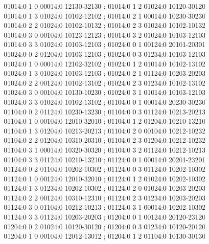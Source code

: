 \documentclass[11pt]{article}
\theoremstyle{remark}
\numberwithin{equation}{section}
\numberwithin{table}{section}
\begin{document}
\begin{flushleft}
01014:0 1 0 00014:0 12130-32130 ; 01014:0 1 2 01024:0 10120-30120\\
01014:0 1 3 01024:0 10102-12102 ; 01014:0 2 1 00014:0 10230-30230\\
01014:0 2 2 01024:0 10102-10132 ; 01014:0 2 3 01024:0 10102-10132\\
01014:0 3 0 00104:0 10123-12123 ; 01014:0 3 2 01024:0 10103-12103\\
01014:0 3 3 01024:0 10103-12103 ; 01024:0 0 1 00124:0 20101-20301\\
01024:0 0 2 01204:0 10103-12103 ; 01024:0 0 3 01234:0 10103-12103\\
01024:0 1 0 00014:0 12102-32102 ; 01024:0 1 2 01014:0 10102-13102\\
01024:0 1 3 01024:0 10103-12103 ; 01024:0 2 1 01124:0 10203-20203\\
01024:0 2 2 00124:0 10102-13102 ; 01024:0 2 3 01234:0 10102-13102\\
01024:0 3 0 00104:0 10130-10230 ; 01024:0 3 1 01014:0 10103-12103\\
01024:0 3 3 01024:0 10102-13102 ; 01104:0 0 1 00014:0 20230-30230\\
01104:0 0 2 01124:0 10230-13230 ; 01104:0 0 3 01124:0 10213-20213\\
01104:0 1 0 00104:0 12010-32010 ; 01104:0 1 2 01204:0 10210-13210\\
01104:0 1 3 01204:0 10213-20213 ; 01104:0 2 0 00104:0 10212-10232\\
01104:0 2 2 01204:0 10310-20310 ; 01104:0 2 3 01204:0 10212-10232\\
01104:0 3 1 00014:0 10320-30320 ; 01104:0 3 2 01124:0 10212-10213\\
01104:0 3 3 01124:0 10210-13210 ; 01124:0 0 1 00014:0 20201-23201\\
01124:0 0 2 01104:0 10202-10302 ; 01124:0 0 3 01124:0 10202-10302\\
01124:0 1 0 00124:0 12010-32010 ; 01124:0 1 2 01024:0 10202-10302\\
01124:0 1 3 01234:0 10202-10302 ; 01124:0 2 0 01024:0 10203-20203\\
01124:0 2 2 00124:0 10310-12310 ; 01124:0 2 3 01234:0 10203-20203\\
01124:0 3 0 01104:0 10212-10213 ; 01124:0 3 1 00014:0 10202-10302\\
01124:0 3 3 01124:0 10203-20203 ; 01204:0 0 1 00124:0 20120-23120\\
01204:0 0 2 01024:0 10120-30120 ; 01204:0 0 3 01234:0 10120-20120\\
01204:0 1 0 00104:0 12012-13012 ; 01204:0 1 2 01104:0 10130-30130\\

\end{flushleft}
\end{document}

